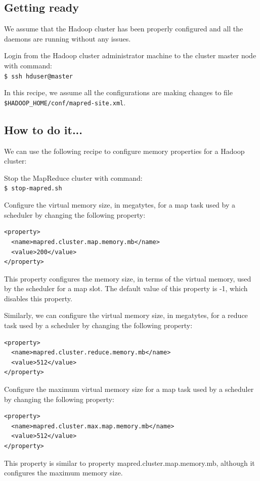 \subsection*{Getting ready}
We assume that the Hadoop cluster has been properly configured and all the daemons are running without any issues.

Login from the Hadoop cluster administrator machine to the cluster master node with command: \\
\verb|$ ssh hduser@master|

In this recipe, we assume all the configurations are making changes to file \verb|$HADOOP_HOME/conf/mapred-site.xml|.
\subsection*{How to do it...}
We can use the following recipe to configure memory properties for a Hadoop cluster:

Stop the MapReduce cluster with command: \\
\verb|$ stop-mapred.sh|

Configure the virtual memory size, in megatytes, for a map task used by a scheduler by changing the following property:
\lstset{style=bashstyle}
\begin{lstlisting}
<property>
  <name>mapred.cluster.map.memory.mb</name>
  <value>200</value>
</property>
\end{lstlisting}

This property configures the memory size, in terms of the virtual memory, used by the scheduler for a map slot. The default value of this property is -1, which disables this property.


Similarly, we can configure the virtual memory size, in megatytes, for a reduce task used by a scheduler by changing the following property:
\lstset{style=bashstyle}
\begin{lstlisting}
<property>
  <name>mapred.cluster.reduce.memory.mb</name>
  <value>512</value>
</property>
\end{lstlisting}

Configure the maximum virtual memory size for a map task used by a scheduler by changing the following property:
\lstset{style=bashstyle}
\begin{lstlisting}
<property>
  <name>mapred.cluster.max.map.memory.mb</name>
  <value>512</value>
</property>
\end{lstlisting}

This property is similar to property  mapred.cluster.map.memory.mb, although it configures the maximum memory size.


